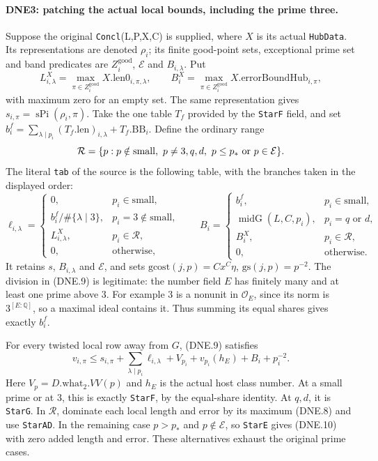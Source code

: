 \paragraph{DNE3: patching the actual local bounds, including the prime three.}
\label{claim:DNE3}
Suppose the original \texttt{Concl}(L,P,X,C) is supplied, where
$X$ is its actual \texttt{HubData}.  Its representations are denoted
$\rho_i$; its finite good-point sets, exceptional prime set and band
predicates are $Z_i^{\mathrm{good}}$, $\mathcal E$ and $B_{i,\lambda}$.
Put
\[
 L^X_{i,\lambda}=\max_{\pi\in Z_i^{\mathrm{good}}}
                       X.\mathrm{len0}_{i,\pi,\lambda},\qquad
 B_i^X=\max_{\pi\in Z_i^{\mathrm{good}}}
                       X.\mathrm{errorBoundHub}_{i,\pi},           \tag{DNE.8}
\]
with maximum zero for an empty set.  The same representation gives
$s_{i,\pi}=\operatorname{sPi}(\rho_i,\pi)$.
Take the one table $T_f$ provided by the \texttt{StarF} field, and set
$b_i^f=\sum_{\lambda\mid p_i}(T_f.\mathrm{len})_{i,\lambda}
             +T_f.\mathrm{BB}_i$.
Define the ordinary range
\[
 \mathcal R=\{p:p\notin\mathrm{small},\ p\ne3,q,d,
                         \ p\le p_*\ \hbox{or}\ p\in\mathcal E\}.
\]
The literal \texttt{tab} of the source is the following table,
with the branches taken in the displayed order:
\[
 \ell_{i,\lambda}=
 \begin{cases}
  0,&p_i\in\mathrm{small},\\
  b_i^f/\#\{\lambda\mid3\},&p_i=3\notin\mathrm{small},\\
  L^X_{i,\lambda},&p_i\in\mathcal R,\\
  0,&\text{otherwise},
 \end{cases}\qquad
 B_i=
 \begin{cases}
  b_i^f,&p_i\in\mathrm{small},\\
  \operatorname{midG}(L,C,p_i),&p_i=q\text{ or }d,\\
  B_i^X,&p_i\in\mathcal R,\\
  0,&\text{otherwise}.
 \end{cases}                                                   \tag{DNE.9}
\]
It retains $s$, $B_{i,\lambda}$ and $\mathcal E$, and sets
$\mathrm{gcost}(j,p)=Cx^C\eta$, $\mathrm{gs}(j,p)=p^{-2}$.
The division in (DNE.9) is legitimate: the number field $E$ has
finitely many and at least one prime above $3$.  For example $3$
is a nonunit in $\mathcal O_E$, since its norm is
$3^{[E:\mathbb Q]}$, so a maximal ideal contains it.
Thus summing its equal shares gives exactly $b_i^f$.

For every twisted local row away from $G$, (DNE.9) satisfies
\[
 v_{i,\pi}\le s_{i,\pi}+\sum_{\lambda\mid p_i}\ell_{i,\lambda}
       +V_{p_i}+v_{p_i}(h_E)+B_i+p_i^{-2}.               \tag{DNE.10}
\]
Here $V_p=D.\mathrm{what}_2.VV(p)$ and $h_E$ is the actual host
class number.  At a small prime or at $3$, this is exactly
\texttt{StarF}, by the equal-share identity.  At $q,d$, it is
\texttt{StarG}.  In $\mathcal R$, dominate each local length and
error by its maximum (DNE.8) and use \texttt{StarAD}.
In the remaining case $p>p_*$ and $p\notin\mathcal E$, so
\texttt{StarE} gives (DNE.10) with zero added length and error.
These alternatives exhaust the original prime cases.

